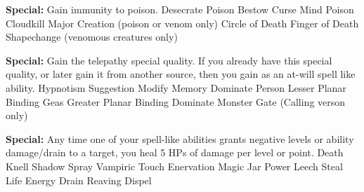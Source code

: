 \begin{multicols}{2}
\textbf{Special: }{Gain immunity to poison.}
\sphere
{Desecrate}
{Poison}
{Bestow Curse}
{Mind Poison}
{Cloudkill}
{Major Creation (poison or venom only)}
{Circle of Death}
{Finger of Death}
{Shapechange (venomous creatures only)}

\textbf{Special: }{Gain the telepathy special quality. If you already have this special quality, or later gain it from another source, then you gain  as an at-will spell like ability.}
\sphere
{Hypnotism}
{Suggestion}
{Modify Memory}
{Dominate Person}
{Lesser Planar Binding}
{Geas}
{Greater Planar Binding}
{Dominate Monster}
{Gate (Calling verson only)}

\textbf{Special: }{Any time one of your spell-like abilities grants negative levels or ability damage/drain to a target, you heal 5 HPs of damage per level or point.}
\sphere
{Death Knell}
{Shadow Spray}
{Vampiric Touch}
{Enervation}
{Magic Jar}
{Power Leech}
{Steal Life}
{Energy Drain}
{Reaving Dispel}

\end{multicols}
